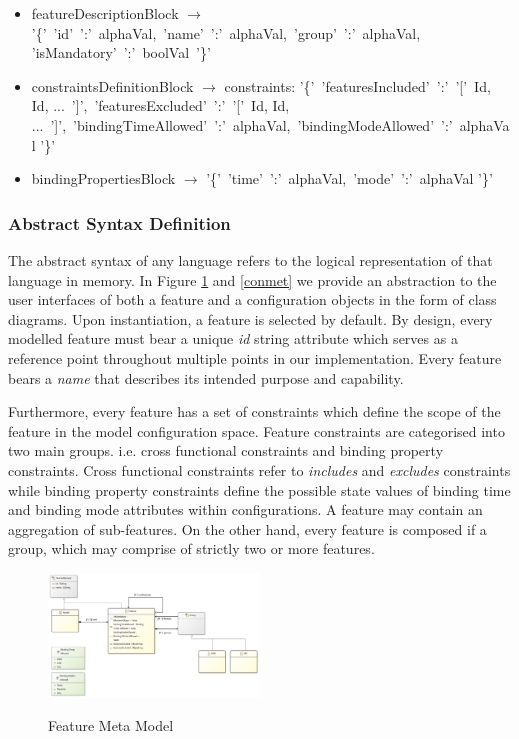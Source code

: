 \documentclass[conference]{IEEEtran}
\begin{document}
\begin{itemize}
	\item[] featureDescriptionBlock $\longrightarrow$ '\{'\ 'id'\ ':'\ alphaVal,\ 'name'\ ':'\ alphaVal,\ 'group'\ ':'\ alphaVal, 'isMandatory'\ ':'\ boolVal\ '\}' \\
	
	\item[] constraintsDefinitionBlock $\longrightarrow$ constraints: '\{'\ 'featuresIncluded'\ ':'\ '['\ Id, Id, ...\ ']',\ 'featuresExcluded'\ ':'\ '['\ Id, Id, ...\ ']',\ 'bindingTimeAllowed'\ ':'\ alphaVal,\ 'bindingModeAllowed'\ ':'\ alphaVal '\}'\\
	
	\item[] bindingPropertiesBlock $\longrightarrow$ '\{'\ 'time'\ ':'\ alphaVal,\ 'mode'\ ':'\ alphaVal '\}'\\
\end{itemize}

\subsubsection{Abstract Syntax Definition}
The abstract syntax of any language refers to the logical representation of that language in memory. In Figure \ref{femet} and \ref{conmet} we provide an abstraction to the user interfaces of both a feature and a configuration objects in the form of class diagrams. Upon instantiation, a feature is selected by default. By design, every modelled feature must bear a unique \textit{id} string attribute which serves as a reference point throughout multiple points in our implementation. Every feature bears a \textit{name} that describes its intended purpose and capability.

Furthermore, every feature has a set of constraints which define the scope of the feature in the model configuration space. Feature constraints are categorised into two main groups. i.e. cross functional constraints and binding property constraints.  Cross functional constraints refer to \textit{includes} and \textit{excludes} constraints while binding property constraints define the possible state values of binding time and binding mode attributes within configurations. A feature may contain an aggregation of sub-features. On the other hand, every feature is composed if a group, which may comprise of strictly two or more features.

\begin{figure}[H]
\caption{Feature Meta Model}
\centering
\includegraphics[width=0.5\textwidth]{diagrams/feature.png}
\label{femet}
\end{figure}
\end{document}
